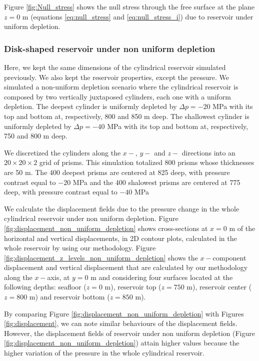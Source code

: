 \documentclass[journal abbreviation, manuscript]{copernicus}
\begin{document}
Figure \ref{fig:Null_stress} shows the  null stress through the free surface at the plane 
$z=0$ m (equations \ref{eq:null_stress} and \ref{eq:null_stress_i}) due to reservoir under uniform depletion.



\subsubsection{Disk-shaped reservoir under non uniform depletion}

Here, we kept the same dimensions of the cylindrical reservoir simulated previously.
We also kept the  reservoir properties, except the pressure.
We simulated a non-uniform depletion scenario where the cylindrical reservoir is composed by two vertically juxtaposed cylinders, each one with a uniform depletion.
The deepest cylinder is uniformly depleted by $\Delta p = -20$ MPa with its top and bottom at, respectively, 800 and 850 m deep.
The shallowest cylinder is uniformly depleted by $\Delta p = -40$ MPa with its top and bottom at, respectively, 750 and 800 m deep.

We  discretized the cylinders  along the $x-$, $y-$ and $z-$ directions into an $20 \times 20 \times 2$ grid of prisms.
This simulation totalized 800 prisms whose thicknesses are 50 m.
The 400 deepest prisms are centered at 825 deep, with pressure contrast equal to $-20$ MPa and the 400 shalowest prisms are centered at 775 deep, with pressure contrast equal to $-40$ MPa  

We calculate the displacement fields due to the pressure change in the whole cylindrical reservoir under non uniform depletion.
Figure \ref{fig:displacement_non_uniform_depletion} shows cross-sections at $x  = 0$ m of the horizontal and vertical displacements, in 2D contour plots, calculated in the whole reservoir by using our methodology.
Figure \ref{fig:displacement_z_levels_non_uniform_depletion} shows the $x-$component displacement and vertical displacement that are calculated by our methodology along the 
$x-$axis, at $y = 0$ m and considering four surfaces located at the following depths:  seafloor ($z = 0$ m), reservoir top ($z = 750$ m), reservoir center ($z = 800$ m) and reservoir bottom ($z = 850$ m).

By comparing Figure \ref{fig:displacement_non_uniform_depletion} with Figures \ref{fig:displacement}, we can note similar behaviours of the displacement fields.
However,  the displacement fields of reservoir under non uniform depletion (Figure \ref{fig:displacement_non_uniform_depletion}) attain higher values because the higher variation of the pressure in the whole cylindrical reservoir.
\end{document}
